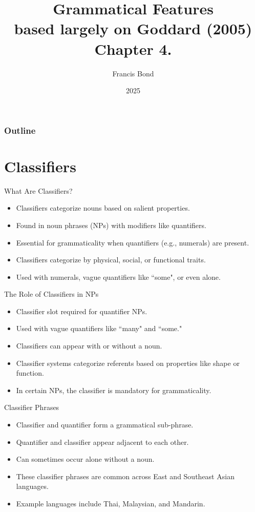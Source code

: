 \documentclass{beamer}
\title[Grammar]{Grammatical Features\\ based largely on Goddard (2005) Chapter 4.}
\author[Francis Bond]{Francis Bond}
\date{2025}
\begin{document}
  \frame{\titlepage}

  \begin{frame}
    \frametitle{Outline}
    \tableofcontents
\end{frame}

\section{Classifiers}


\begin{frame}{What Are Classifiers?}
\begin{itemize}
    \item Classifiers categorize nouns based on salient properties.
    \item Found in noun phrases (NPs) with modifiers like quantifiers.
    \item Essential for grammaticality when quantifiers (e.g., numerals) are present.
    \item Classifiers categorize by physical, social, or functional traits.
    \item Used with numerals, vague quantifiers like ``some", or even alone.
\end{itemize}
\end{frame}

\begin{frame}{The Role of Classifiers in NPs}
\begin{itemize}
    \item Classifier slot required for quantifier NPs.
    \item Used with vague quantifiers like ``many" and ``some."
    \item Classifiers can appear with or without a noun.
    \item Classifier systems categorize referents based on properties like shape or function.
    \item In certain NPs, the classifier is mandatory for grammaticality.
\end{itemize}
\end{frame}

\begin{frame}{Classifier Phrases}
\begin{itemize}
    \item Classifier and quantifier form a grammatical sub-phrase.
    \item Quantifier and classifier appear adjacent to each other.
    \item Can sometimes occur alone without a noun.
    \item These classifier phrases are common across East and Southeast Asian languages.
    \item Example languages include Thai, Malaysian, and Mandarin.
\end{itemize}
\end{frame}
\end{document}
